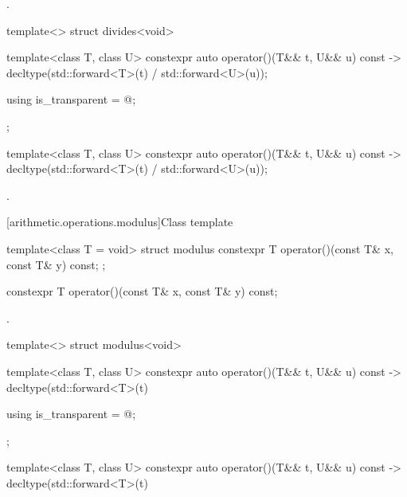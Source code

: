 \begin{itemdescr}
\pnum
\returns
{}.
\end{itemdescr}

%
\begin{itemdecl}
template<> struct divides<void> {
  template<class T, class U> constexpr auto operator()(T&& t, U&& u) const
    -> decltype(std::forward<T>(t) / std::forward<U>(u));

  using is_transparent = @\unspec@;
};
\end{itemdecl}

%
\begin{itemdecl}
template<class T, class U> constexpr auto operator()(T&& t, U&& u) const
    -> decltype(std::forward<T>(t) / std::forward<U>(u));
\end{itemdecl}

\begin{itemdescr}
\pnum
\returns
{}.
\end{itemdescr}

[arithmetic.operations.modulus]{Class template }

%
\begin{itemdecl}
template<class T = void> struct modulus {
  constexpr T operator()(const T& x, const T& y) const;
};
\end{itemdecl}

%
\begin{itemdecl}
constexpr T operator()(const T& x, const T& y) const;
\end{itemdecl}

\begin{itemdescr}
\pnum
\returns
{}.
\end{itemdescr}

%
\begin{itemdecl}
template<> struct modulus<void> {
  template<class T, class U> constexpr auto operator()(T&& t, U&& u) const
    -> decltype(std::forward<T>(t) %

  using is_transparent = @\unspec@;
};
\end{itemdecl}

%
\begin{itemdecl}
template<class T, class U> constexpr auto operator()(T&& t, U&& u) const
    -> decltype(std::forward<T>(t) %
\end{itemdecl}


